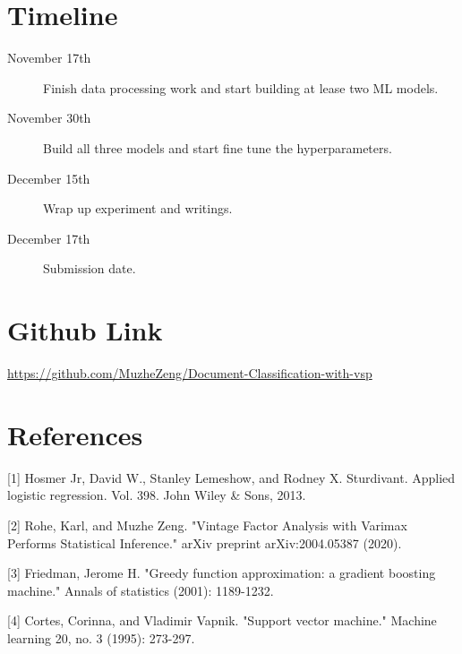 \documentclass{article}
\begin{document}
\section{Timeline}
\begin{description}
\item[November 17th] Finish data processing work and start building at lease two ML models. 
\item[November 30th] Build all three models and start fine tune the hyperparameters.
\item[December 15th] Wrap up experiment and writings.
\item[December 17th] Submission date.
\end{description}

\section{Github Link}
\url{https://github.com/MuzheZeng/Document-Classification-with-vsp}


\section*{References}
\medskip
\small

[1] Hosmer Jr, David W., Stanley Lemeshow, and Rodney X. Sturdivant. Applied logistic regression. Vol. 398. John Wiley \& Sons, 2013.

[2] Rohe, Karl, and Muzhe Zeng. "Vintage Factor Analysis with Varimax Performs Statistical Inference." arXiv preprint arXiv:2004.05387 (2020).

[3] Friedman, Jerome H. "Greedy function approximation: a gradient boosting machine." Annals of statistics (2001): 1189-1232.

[4] Cortes, Corinna, and Vladimir Vapnik. "Support vector machine." Machine learning 20, no. 3 (1995): 273-297.
\end{document}
